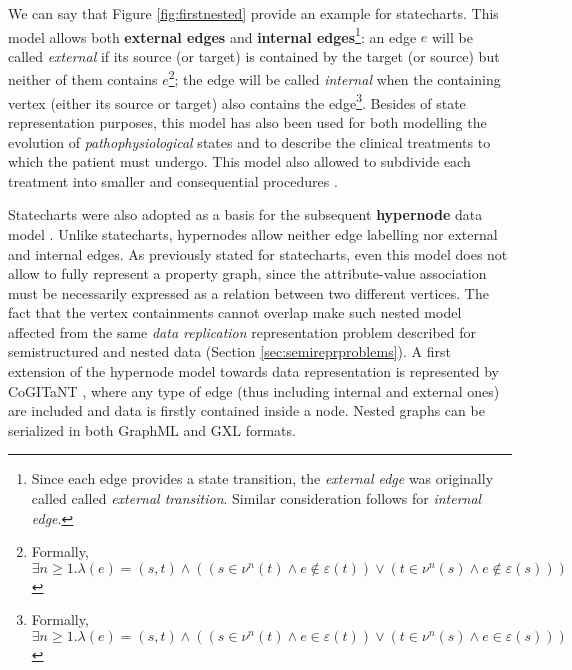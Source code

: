 We can say that Figure \ref{fig:firstnested} provide an example for statecharts. This model allows both \textbf{external edges} and \textbf{internal edges}\footnote{Since each edge provides a state transition, the \textit{external edge} was originally called called \textit{external transition}. Similar consideration follows for \textit{internal edge}.}: an edge  $e$ will be called \textit{external} if its source (or target) is contained by the target (or source) but neither of them contains $e$\footnote{Formally, $\exists n\geq 1.\lambda(e)=(s,t)\wedge ((s\in\nu^n(t) \wedge e\notin \varepsilon(t))\vee (t\in \nu^n(s)\wedge e\notin \varepsilon(s)))$}; the edge will be called \textit{internal} when the containing vertex (either its source or target) also contains the edge\footnote{Formally, $\exists n\geq 1.\lambda(e)=(s,t)\wedge ((s\in\nu^n(t) \wedge e\in \varepsilon(t))\vee (t\in \nu^n(s)\wedge e\in \varepsilon(s)))$}. Besides of state representation purposes, this model has also been  used for both modelling the evolution of \textit{pathophysiological} states and to describe the clinical treatments to which the patient must undergo. This model also allowed to subdivide each treatment  into smaller and consequential procedures \cite{NestedGlaucoma}.

Statecharts were also adopted as a basis for the subsequent \textbf{hypernode} data model \cite{Poulovassilis1994}. Unlike statecharts, hypernodes allow neither edge labelling nor external and internal edges. As previously stated for statecharts, even this model does not allow to fully represent a property graph, since the attribute-value association must be necessarily expressed as a relation between two different vertices. The fact that the vertex containments cannot overlap make such nested model affected from the same \textit{data replication} representation problem described for semistructured and nested data (Section \vref{sec:semireprproblems}). A first extension of the hypernode model towards data representation is represented by CoGITaNT \cite{GenestS98}, where any type of edge (thus including internal and external ones) are included and data is firstly contained inside a node. Nested graphs can be serialized in both GraphML \cite{graphml} and GXL \cite{GXL} formats. 